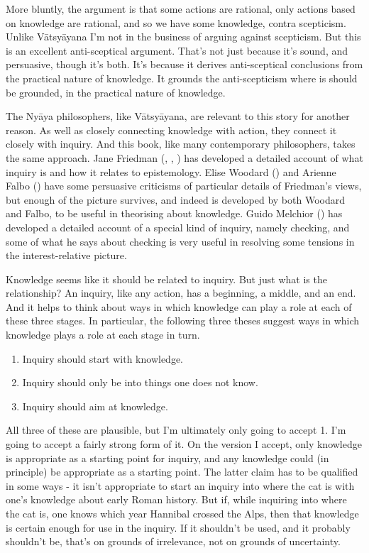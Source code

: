 \documentclass[
  12pt,
  letterpaper,
]{scrbook}
\providecommand{\tightlist}{%
  \setlength{\itemsep}{0pt}\setlength{\parskip}{0pt}}\usepackage{longtable,booktabs,array}
\begin{document}
More bluntly, the argument is that some actions are rational, only
actions based on knowledge are rational, and so we have some knowledge,
contra scepticism. Unlike Vātsyāyana I'm not in the business of arguing
against scepticism. But this is an excellent anti-sceptical argument.
That's not just because it's sound, and persuasive, though it's both.
It's because it derives anti-sceptical conclusions from the practical
nature of knowledge. It grounds the anti-scepticism where is should be
grounded, in the practical nature of knowledge.

The Nyāya philosophers, like Vātsyāyana, are relevant to this story for
another reason. As well as closely connecting knowledge with action,
they connect it closely with inquiry. And this book, like many
contemporary philosophers, takes the same approach. Jane Friedman
(,
, )
has developed a detailed account of what inquiry is and how it relates
to epistemology. Elise Woodard () and
Arienne Falbo () have some persuasive
criticisms of particular details of Friedman's views, but enough of the
picture survives, and indeed is developed by both Woodard and Falbo, to
be useful in theorising about knowledge. Guido Melchior
() has developed a detailed account of
a special kind of inquiry, namely checking, and some of what he says
about checking is very useful in resolving some tensions in the
interest-relative picture.

Knowledge seems like it should be related to inquiry. But just what is
the relationship? An inquiry, like any action, has a beginning, a
middle, and an end. And it helps to think about ways in which knowledge
can play a role at each of these three stages. In particular, the
following three theses suggest ways in which knowledge plays a role at
each stage in turn.

\begin{enumerate}
\def\labelenumi{\arabic{enumi}.}
\tightlist
\item
  Inquiry should start with knowledge.
\item
  Inquiry should only be into things one does not know.
\item
  Inquiry should aim at knowledge.
\end{enumerate}

All three of these are plausible, but I'm ultimately only going to
accept 1. I'm going to accept a fairly strong form of it. On the version
I accept, only knowledge is appropriate as a starting point for inquiry,
and any knowledge could (in principle) be appropriate as a starting
point. The latter claim has to be qualified in some ways - it isn't
appropriate to start an inquiry into where the cat is with one's
knowledge about early Roman history. But if, while inquiring into where
the cat is, one knows which year Hannibal crossed the Alps, then that
knowledge is certain enough for use in the inquiry. If it shouldn't be
used, and it probably shouldn't be, that's on grounds of irrelevance,
not on grounds of uncertainty.
\end{document}
